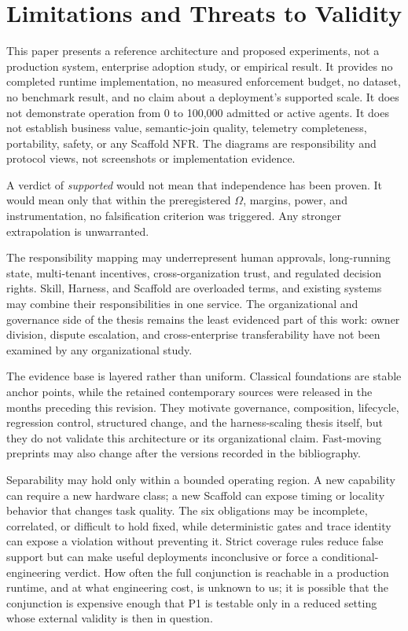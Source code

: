 \documentclass[11pt]{article}
\begin{document}
\section{Limitations and Threats to Validity}
\label{sec:limitations}

This paper presents a reference architecture and proposed experiments, not a production system, enterprise adoption study, or empirical result. It provides no completed runtime implementation, no measured enforcement budget, no dataset, no benchmark result, and no claim about a deployment's supported scale. It does not demonstrate operation from 0 to 100{,}000 admitted or active agents. It does not establish business value, semantic-join quality, telemetry completeness, portability, safety, or any Scaffold NFR. The diagrams are responsibility and protocol views, not screenshots or implementation evidence.

A verdict of \textit{supported} would not mean that independence has been proven. It would mean only that within the preregistered $\Omega$, margins, power, and instrumentation, no falsification criterion was triggered. Any stronger extrapolation is unwarranted.

The responsibility mapping may underrepresent human approvals, long-running state, multi-tenant incentives, cross-organization trust, and regulated decision rights. Skill, Harness, and Scaffold are overloaded terms, and existing systems may combine their responsibilities in one service. The organizational and governance side of the thesis remains the least evidenced part of this work: owner division, dispute escalation, and cross-enterprise transferability have not been examined by any organizational study.

The evidence base is layered rather than uniform. Classical foundations are stable anchor points, while the retained contemporary sources were released in the months preceding this revision. They motivate governance, composition, lifecycle, regression control, structured change, and the harness-scaling thesis itself, but they do not validate this architecture or its organizational claim. Fast-moving preprints may also change after the versions recorded in the bibliography.

Separability may hold only within a bounded operating region. A new capability can require a new hardware class; a new Scaffold can expose timing or locality behavior that changes task quality. The six obligations may be incomplete, correlated, or difficult to hold fixed, while deterministic gates and trace identity can expose a violation without preventing it. Strict coverage rules reduce false support but can make useful deployments inconclusive or force a conditional-engineering verdict. How often the full conjunction is reachable in a production runtime, and at what engineering cost, is unknown to us; it is possible that the conjunction is expensive enough that P1 is testable only in a reduced setting whose external validity is then in question.
\end{document}
